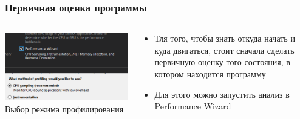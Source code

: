 \documentclass[10pt]{beamer}
\begin{document}
\begin{frame}
\frametitle{Первичная оценка программы}


\begin{columns}[c]

\begin{center}
  \includegraphics[width=\textwidth]{res/img/AnalysisTargetWay.png}
  Выбор режима профилирования
\end{center}

\begin{block}{}
\begin{itemize}
  \item Тля того, чтобы знать откуда начать и куда двигаться, стоит сначала сделать первичную оценку того состояния, в котором находится программу
  \item Для этого можно запустить анализ в Performance Wizard
\end{itemize}
\end{block}

\end{columns}

\end{frame}
\end{document}
